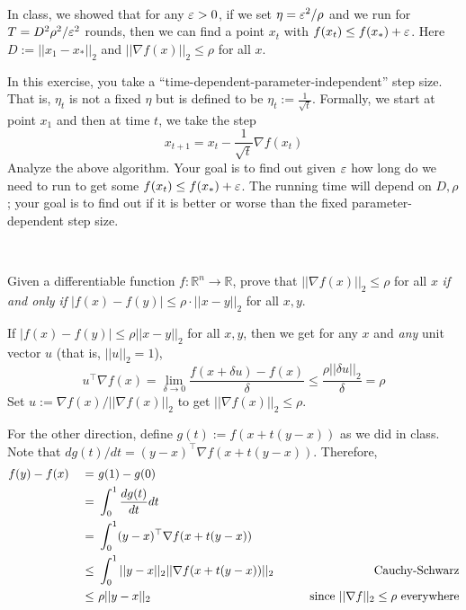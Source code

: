 \documentclass[11pt]{article}
\newcommand{\grad}{\nabla}
\newcommand{\solution}[1]{\noindent {\color{blue} {\bf Solution:}} {\color{gray} {#1}}}
\newcommand{\solution}[1]{\ignore{#1}}
\begin{document}
\vspace{1ex}
\begin{exercise} \Coffeecup \Coffeecup \Coffeecup~
	
	In class, we showed that for any $\varepsilon > 0$, if we set $\eta = \varepsilon^2/\rho$ and we run for $T = D^2 \rho^2/\varepsilon^2$ rounds, then we can find a point $x_t$ with $f(x_t) \leq f(x_*) + \varepsilon$.	Here $D := ||x_1 - x_*||_2$ and $||\grad f(x)||_2 \leq \rho$ for all $x$.
	
	In this exercise, you take a ``time-dependent-parameter-independent'' step size. That is, $\eta_t$ is not a fixed $\eta$ but is defined to be $\eta_t := \frac{1}{\sqrt{t}}$. Formally, we start at point $x_1$ and then at time $t$, we take the step
	\[
	x_{t+1} = x_t - \frac{1}{\sqrt{t}} \grad f(x_t)
	\]
	Analyze the above algorithm. Your goal is to find out given $\varepsilon$ how long do we need to run to get some $f(x_t) \leq f(x_*) + \varepsilon$.
	The running time will depend on $D,\rho$; your goal is to find out if it is better or worse than the fixed parameter-dependent step size.
\end{exercise}

\vspace{1ex}
\begin{exercise} \Coffeecup \Coffeecup~
	
	Given a differentiable function $f:\mathbb{R}^n \to \mathbb{R}$, prove that 
	$||\grad f(x)||_2 \leq \rho$ for all $x$ {\em if and only if} 
	$|f(x) - f(y)| \leq \rho\cdot ||x - y||_2$ for all $x,y$.
	
\end{exercise}

\solution{
If $|f(x) - f(y)| \leq \rho||x-y||_2$ for all $x,y$, then we get for any $x$ and {\em any} unit vector $u$ (that is, $||u||_2 = 1$),
\[
u^\top \grad f(x)  = \lim_{\delta \to 0} \frac{f(x + \delta u) - f(x)}{\delta} \leq \frac{\rho ||\delta u||_2}{\delta} = \rho
\]
Set $u := \grad f(x)/||\grad f(x)||_2$ to get $||\grad f(x)||_2 \leq \rho$. \smallskip

For the other direction, define $g(t) := f(x + t(y-x))$ as we did in class. Note that $dg(t)/dt = (y-x)^\top \grad f(x + t(y-x))$.
Therefore,
\begin{alignat}{4}
	f(y) - f(x) && ~=~ & g(1) - g(0) \notag \\
				&& ~=~ &  \int_0^1 \frac{dg(t)}{dt} dt \notag \\
				&& ~=~ &  \int_0^1 (y - x)^\top \grad{f}(x + t(y-x)) \notag \\
				&& ~\leq~ & \int_0^1 ||y-x||_2||\grad{f}(x+t(y-x))||_2 & \qquad \textrm{Cauchy-Schwarz} \notag \\
				&& ~\leq~ & \rho ||y -x ||_2 & \qquad \textrm{since $||\grad f||_2 \leq \rho$ everywhere} \notag
\end{alignat}

}
\end{document}

